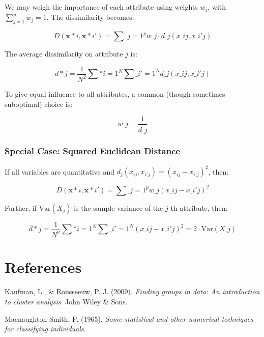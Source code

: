 \documentclass[
]{article}
\newlength{\cslhangindent}
\newlength{\cslentryspacingunit} %
\newenvironment{CSLReferences}[2] %
 {%
  \setlength{\parindent}{0pt}
  \ifodd #1
  \let\oldpar\par
  \def\par{\hangindent=\cslhangindent\oldpar}
  \fi
  \setlength{\parskip}{#2\cslentryspacingunit}
 }%
 {}
\begin{document}
We may weigh the importance of each attribute using weights \(w_j\),
with \(\sum_{j=1}^p w_j = 1\). The dissimilarity becomes:

\begin{equation}
D(\mathbf{x}*i, \mathbf{x}*{i'}) = \sum\_{j=1}^p w\_j \cdot d\_j(x\_{ij}, x\_{i'j})
\end{equation}

The average dissimilarity on attribute \(j\) is:

\begin{equation}
\bar{d}*j = \frac{1}{N^2} \sum*{i=1}^N \sum\_{i'=1}^N d\_j(x\_{ij}, x\_{i'j})
\end{equation}

To give equal influence to all attributes, a common (though sometimes
suboptimal) choice is:

\begin{equation}
w\_j = \frac{1}{\bar{d}\_j}
\end{equation}

\hypertarget{special-case-squared-euclidean-distance}{%
\subsubsection{Special Case: Squared Euclidean
Distance}\label{special-case-squared-euclidean-distance}}

If all variables are quantitative and
\(d_j(x_{ij}, x_{i'j}) = (x_{ij} - x_{i'j})^2\), then:

\begin{equation}
D(\mathbf{x}*i, \mathbf{x}*{i'}) = \sum\_{j=1}^p w\_j (x\_{ij} - x\_{i'j})^2
\end{equation}

Further, if \(\mathrm{Var}(X_j)\) is the sample variance of the \(j\)-th
attribute, then:

\begin{equation}
\bar{d}*j = \frac{1}{N^2} \sum*{i=1}^N \sum\_{i'=1}^N (x\_{ij} - x\_{i'j})^2 = 2 \cdot \mathrm{Var}(X\_j)
\end{equation}

\hypertarget{references}{%
\section*{References}\label{references}}

\hypertarget{refs}{}
\begin{CSLReferences}{1}{0}
\leavevmode{}%
Kaufman, L., \& Rousseeuw, P. J. (2009). \emph{Finding groups in data:
An introduction to cluster analysis}. John Wiley \& Sons.

\leavevmode{}%
Macnaughton-Smith, P. (1965). \emph{Some statistical and other numerical
techniques for classifying individuals}.

\end{CSLReferences}
\end{document}
